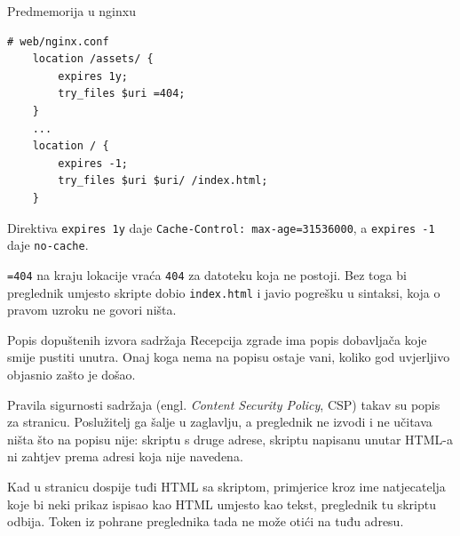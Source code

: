 \begin{frame}[fragile]{Predmemorija u nginxu}
\begin{lstlisting}
# web/nginx.conf
    location /assets/ {
        expires 1y;
        try_files $uri =404;
    }
    ...
    location / {
        expires -1;
        try_files $uri $uri/ /index.html;
    }
\end{lstlisting}

\vspace{0.3em}
Direktiva \mbox{\texttt{expires 1y}} daje \mbox{\texttt{Cache-Control: max-age=31536000}}, a \mbox{\texttt{expires -1}} daje \texttt{no-cache}.

\vspace{0.3em}
\texttt{=404} na kraju lokacije  vraća \texttt{404} za datoteku koja ne postoji. Bez toga bi preglednik umjesto skripte dobio \texttt{index.html} i javio pogrešku u sintaksi, koja o pravom uzroku ne govori ništa.
\end{frame}

\begin{frame}{Popis dopuštenih izvora sadržaja}
Recepcija zgrade ima popis dobavljača koje smije pustiti unutra. Onaj koga nema na popisu ostaje vani, koliko god uvjerljivo objasnio zašto je došao.

\vspace{0.9em}
Pravila sigurnosti sadržaja (engl. \emph{Content Security Policy}, CSP) takav su popis za stranicu. Poslužitelj ga šalje u zaglavlju, a preglednik ne izvodi i ne učitava ništa što na popisu nije: skriptu s druge adrese, skriptu napisanu unutar HTML-a ni zahtjev prema adresi koja nije navedena.

\vspace{0.9em}
Kad u stranicu dospije tuđi HTML sa skriptom, primjerice kroz ime natjecatelja koje bi neki prikaz ispisao kao HTML umjesto kao tekst, preglednik tu skriptu odbija. Token iz pohrane preglednika tada ne može otići na tuđu adresu.
\end{frame}

